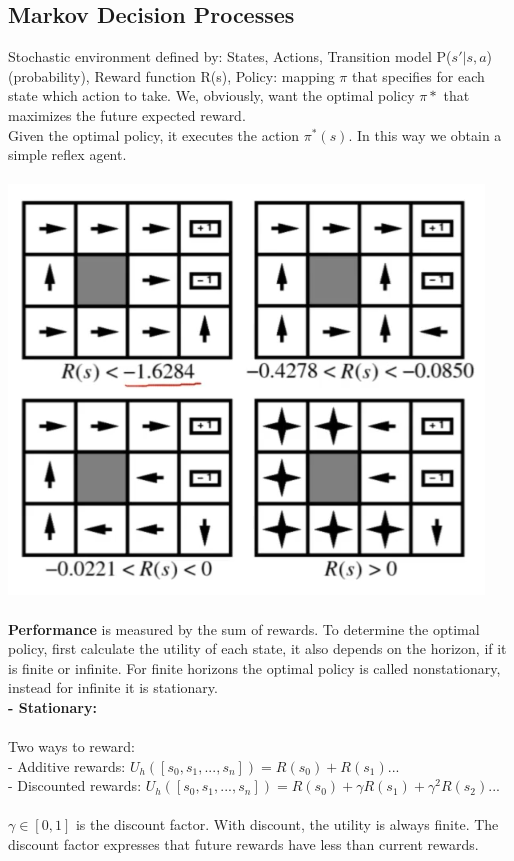 \documentclass{article}
\begin{document}
\subsection{Markov Decision Processes}
Stochastic environment defined by: States, Actions, Transition model P($s'|s,a$) (probability), Reward function R(s), Policy: mapping $\pi$ that specifies for each state which action to take. We, obviously, want the optimal policy $\pi*$ that maximizes the future expected reward.\\
Given the optimal policy, it executes the action $\pi^*(s)$. In this way we obtain a simple reflex agent.\\\\
\includegraphics[scale=0.5]{78.png}\\\\
\textbf{Performance} is measured by the sum of rewards. To determine the optimal policy, first calculate the utility of each state, it also depends on the horizon, if it is finite or infinite. For finite horizons the optimal policy is called nonstationary, instead for infinite it is stationary.\\

\textbf{- Stationary: }\\\\
Two ways to reward:\\
- Additive rewards: $U_h([s_0,s_1,...,s_n]) = R(s_0) + R(s_1)...$\\
- Discounted rewards: $U_h([s_0,s_1,...,s_n]) = R(s_0) + \gamma R(s_1)+ \gamma^2R(s_2)...$\\\\
$\gamma \in [0,1]$ is the discount factor. With discount, the utility is always finite. The discount factor expresses that future rewards have less than current rewards.
\end{document}
